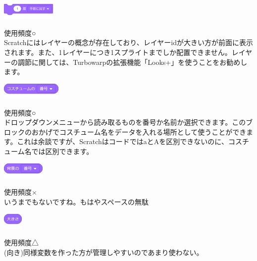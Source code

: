 \documentclass[b5paper,10pt]{jsarticle}
\begin{document}
\begin{multicols*}{3}
\begin{itembox}{12}
\includegraphics[height=8mm]{images/looks_17.png}
\end{itembox}
使用頻度○\\
Scratchにはレイヤーの概念が存在しており、レイヤーidが大きい方が前面に表示されます。また、1レイヤーにつき1スプライトまでしか配置できません。レイヤーの調節に関しては、Turbowarpの拡張機能「Looks+」を使うことをお勧めします。
\begin{itembox}{13}
\includegraphics[height=8mm]{images/looks_18.png}
\end{itembox}
使用頻度○\\
ドロップダウンメニューから読み取るものを番号か名前か選択できます。このブロックのおかげでコスチューム名をデータを入れる場所として使うことができます。これは余談ですが、ScratchはコードではaとAを区別できないのに、コスチューム名では区別できます。
\begin{itembox}{14}
\includegraphics[height=8mm]{images/looks_19.png}
\end{itembox}
使用頻度×\\
いうまでもないですね。もはやスペースの無駄
\begin{itembox}{15}
\includegraphics[height=8mm]{images/looks_20.png}
\end{itembox}
使用頻度△\\
(向き)同様変数を作った方が管理しやすいのであまり使わない。


\end{multicols*}
\end{document}
